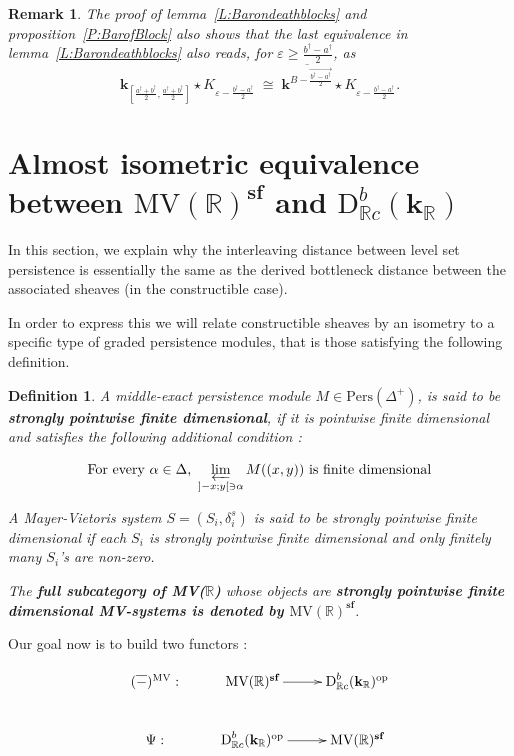 \documentclass[a4paper, english, 11pt]{article}
\newcommand{\kk}[0]{\textbf{k}}
\newcommand{\0}{\vec{0}}
\newcommand{\R}[0]{\mathbb{R}}
\newcommand{\D}[0]{\text{D}}
\newcommand{\op}[0]{\text{op}}
\newcommand{\Pers}[0]{\text{Pers}}
\newcommand{\s}{\textbf{sf}}
\newtheorem{remark}[prop]{Remark}
\newtheorem{defi}[prop]{Definition}
\begin{document}
\begin{remark} The proof of lemma~\ref{L:Barondeathblocks} and proposition~\ref{P:BarofBlock} also shows that the last equivalence in lemma~\ref{L:Barondeathblocks} also reads, for $\varepsilon \geq \frac{b^\dagger-a^\dagger}{2}$, as
 \begin{equation}
  \kk_{[\frac{a^\dagger+b^\dagger}{2}, \frac{a^\dagger+b^\dagger}{2}]}\star K_{\varepsilon -\frac{b^\dagger -a^\dagger}{2}} \; \cong \; \overline{\kk^{B -\overrightarrow{\frac{b^\dagger-a^\dagger}{2}}}} \star  K_{\varepsilon -\frac{b^\dagger -a^\dagger}{2}}.
 \end{equation}

\end{remark}


\section{ Almost isometric equivalence between $\mbox{MV}(\R)^\s$ and $\D^b_{\R c}(\kk_\R)$}
In this section, we explain why the interleaving distance between level set persistence is essentially the same as the derived bottleneck distance between the associated sheaves (in the constructible case).

In order to express this we will relate constructible sheaves by an isometry to a specific type of graded persistence modules, that is those satisfying the following definition.
\begin{defi}\label{D:spfd}
 A middle-exact persistence module $M\in \Pers(\Delta^+)$, is said to be \textbf{strongly pointwise finite dimensional}, if it is pointwise finite dimensional and satisfies the following additional condition : 

$$\text{For every $\alpha \in \Delta$,}~ \varprojlim_{]-x;y[\ni \alpha}M((x,y))  ~ \text{is finite dimensional} $$

A  Mayer-Vietoris system $S=(S_i,\delta^s_i)$ is said to be strongly pointwise finite dimensional if each $S_i$ is strongly pointwise finite dimensional  and only finitely many  $S_i$'s are non-zero.

The \textbf{full subcategory of MV($\R$)} whose objects are \textbf{strongly pointwise finite dimensional MV-systems is denoted by $\text{MV}(\R)^\s$}.
\end{defi}



Our goal now is to build two functors : 


$$\xymatrix{
(\overline{-})^{\text{MV}} :&  \text{MV}(\R)^\s \ar[r] &\D^b_{\R c}(\kk_\R)^{\op}  \\
\Psi  :&  \D^b_{\R c}(\kk_\R)^{\op} \ar[r] & \text{MV}(\R)^\s 
}$$
\end{document}
